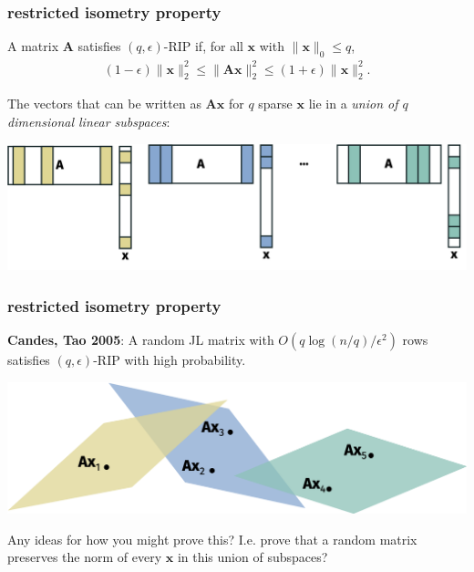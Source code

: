 \documentclass[compress]{beamer}
\newcommand{\bv}[1]{\mathbf{#1}}
\begin{document}
\begin{frame}
	\frametitle{restricted isometry property}
	\begin{definition}
		A matrix $\bv{A}$ satisfies $(q,\epsilon)$-RIP if, for all $\bv{x}$ with $\|\bv{x}\|_0 \leq q$, 
		\begin{align*}
			(1-\epsilon)\|\bv{x}\|_2^2 \leq \|\bv{A}\bv{x}\|_2^2 \leq  (1+\epsilon)\|\bv{x}\|_2^2.
		\end{align*}
	\end{definition}
	The vectors that can be written as $\bv{A}\bv{x}$ for $q$ sparse $\bv{x}$ lie in a \emph{union of $q$ dimensional linear subspaces}:
	\begin{center}
		\includegraphics[width=\textwidth]{subspaces1.png}
	\end{center}
\end{frame}

\begin{frame}[t]
	\frametitle{restricted isometry property}
	\begin{center}
		\textbf{Candes, Tao 2005}: A random JL matrix with $O(q\log (n/q)/\epsilon^2)$ rows satisfies $(q,\epsilon)$-RIP with high probability.
		
		\includegraphics[width=\textwidth]{subspaces.png}
		
		Any ideas for how you might prove this? I.e. prove that a random matrix preserves the norm of every $\bv{x}$ in this union of subspaces?
	\end{center}
\end{frame}
\end{document}
